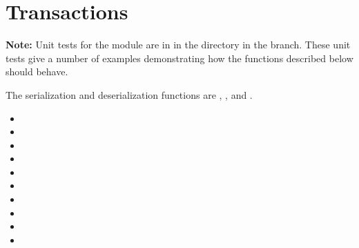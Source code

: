 \section{Transactions}


{\bf{Note:}} Unit tests for the {} module are in {}
in the {}
directory in the {} branch.
These unit tests give a number of examples demonstrating how the functions described below should behave.

{}
{}

The serialization and deserialization functions are
{},
{},
{}
and
{}.

\begin{itemize}
\item {}
\item {}
\item {}
\item {}
\item {}
\item {}
\item {}
\item {}
\item {}
\item {}
\end{itemize}

